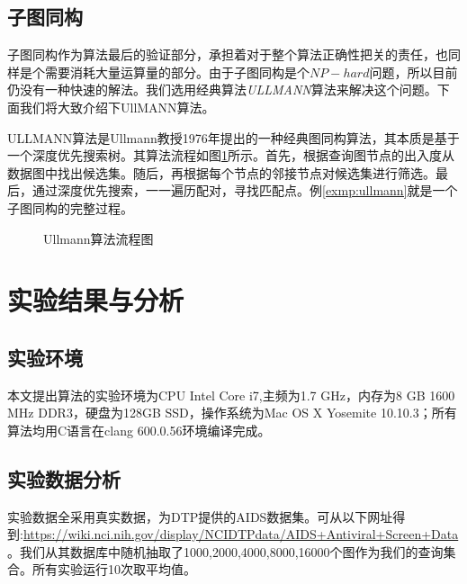 \documentclass{XDBAthesis}
\numberwithin{algorithm}{chapter}
\begin{document}
\subsection{子图同构}
子图同构作为算法最后的验证部分，承担着对于整个算法正确性把关的责任，也同样是个需要消耗大量运算量的部分。由于子图同构是个$NP-hard$问题，所以目前仍没有一种快速的解法。我们选用经典算法\emph{ULLMANN}算法\cite{ullmann}来解决这个问题。下面我们将大致介绍下UllMANN算法。

ULLMANN算法是Ullmann教授1976年提出的一种经典图同构算法，其本质是基于一个深度优先搜索树。其算法流程如图\ref{fg:ullmanchart}所示。首先，根据查询图节点的出入度从数据图中找出候选集。随后，再根据每个节点的邻接节点对候选集进行筛选。最后，通过深度优先搜索，一一遍历配对，寻找匹配点。例\ref{exmp:ullmann}就是一个子图同构的完整过程。
\begin{figure}
    \caption{Ullmann算法流程图}
    \label{fg:ullmanchart}
\end{figure}
\begin{exmp}
    \label{exmp:ullmann}    
\end{exmp}


\section{实验结果与分析}
\subsection{实验环境}
本文提出算法的实验环境为CPU Intel Core i7,主频为1.7 GHz，内存为8 GB 1600 MHz DDR3，硬盘为128GB SSD，操作系统为Mac OS X Yosemite 10.10.3；所有算法均用C语言在clang 600.0.56环境编译完成。
\subsection{实验数据分析}
实验数据全采用真实数据，为DTP提供的AIDS数据集。可从以下网址得到:\url{https://wiki.nci.nih.gov/display/NCIDTPdata/AIDS+Antiviral+Screen+Data}。我们从其数据库中随机抽取了1000,2000,4000,8000,16000个图作为我们的查询集合。所有实验运行10次取平均值。
\end{document}
